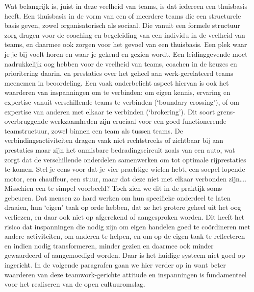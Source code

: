 \documentclass[empirical, authordate, ]{new-jote-article}
\begin{document}
	Wat belangrijk is, juist in deze veelheid van teams, is dat iedereen een thuisbasis heeft. Een thuisbasis in de vorm van een of meerdere teams die een structurele basis geven, zowel organisatorisch als sociaal. Die vanuit een formele structuur zorg dragen voor de coaching en begeleiding van een individu in de veelheid van teams, en daarmee ook zorgen voor het gevoel van een thuisbasis. Een plek waar je je bij voelt horen en waar je gekend en gezien wordt. Een leidinggevende moet nadrukkelijk oog hebben voor de veelheid van teams, coachen in de keuzes en prioritering daarin, en prestaties over het geheel aan werk-gerelateerd teams meenemen in beoordeling. Een vaak onderbelicht aspect hiervan is ook het waarderen van inspanningen om te verbinden: om eigen kennis, ervaring en expertise vanuit verschillende teams te verbinden (‘boundary crossing'), of om expertise van anderen met elkaar te verbinden (‘brokering'). Dit soort grens-overbruggende werkzaamheden zijn cruciaal voor een goed functionerende teamstructuur, zowel binnen een team als tussen teams. De verbindingsactiviteiten dragen vaak niet rechtstreeks of zichtbaar bij aan prestaties maar zijn het onmisbare bedradingscircuit zoals van een auto, wat zorgt dat de verschillende onderdelen samenwerken om tot optimale rijprestaties te komen. Stel je eens voor dat je vier prachtige wielen hebt, een soepel lopende motor, een chauffeur, een stuur, maar dat deze niet met elkaar verbonden zijn…. Misschien een te simpel voorbeeld? Toch zien we dit in de praktijk soms gebeuren. Dat mensen zo hard werken om hun specifieke onderdeel te laten draaien, hun ‘eigen' taak op orde hebben, dat ze het grotere geheel uit het oog verliezen, en daar ook niet op afgerekend of aangesproken worden. Dit heeft het risico dat inspanningen die nodig zijn om eigen handelen goed te coördineren met andere activiteiten, om anderen te helpen, en om op de eigen taak te reflecteren en indien nodig transformeren, minder gezien en daarmee ook minder gewaardeerd of aangemoedigd worden. Daar is het huidige systeem niet goed op ingericht. In de volgende paragrafen gaan we hier verder op in want beter waarderen van deze teamwork-gerichte attitude en inspanningen is fundamenteel voor het realiseren van de open cultuuromslag.
\end{document}
